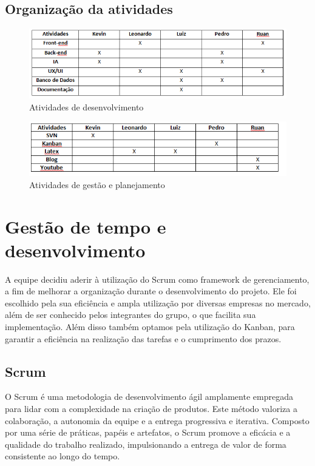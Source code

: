 \subsection{Organização da atividades}
    \item \begin{figure}[!htb]
 	    \centering
 	    \caption{\label{logo}Atividades de desenvolvimento}
 	    \includegraphics[width=16cm]{img/tabela-papeis-1.png}
\end{figure}


    \item \begin{figure}[!htb]
 	    \centering
 	    \caption{\label{logo}Atividades de gestão e planejamento}
 	    \includegraphics[width=16cm]{img/tabela-papeis-2.png}
\end{figure}

\section{Gestão de tempo e desenvolvimento}
A equipe decidiu aderir à utilização do Scrum como framework de gerenciamento, a fim de melhorar a organização durante o desenvolvimento do projeto. Ele foi escolhido pela sua eficiência e ampla utilização por diversas empresas no mercado, além de ser conhecido pelos integrantes do grupo, o que facilita sua implementação.  Além disso também optamos pela utilização do Kanban, para garantir a eficiência na realização das tarefas e o cumprimento dos prazos.

\subsection{Scrum}
O Scrum é uma metodologia de desenvolvimento ágil amplamente empregada para lidar com a complexidade na criação de produtos. Este método valoriza a colaboração, a autonomia da equipe e a entrega progressiva e iterativa. Composto por uma série de práticas, papéis e artefatos, o Scrum promove a eficácia e a qualidade do trabalho realizado, impulsionando a entrega de valor de forma consistente ao longo do tempo.

